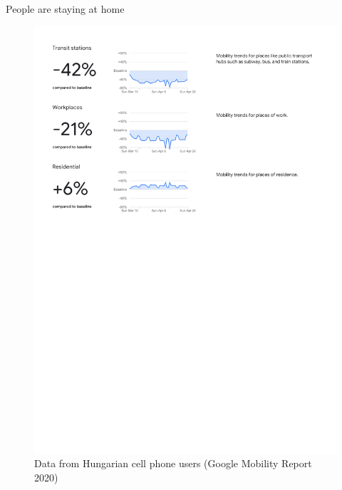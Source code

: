 \documentclass[ignorenonframetext,aspectratio=54,]{beamer}
\begin{document}
\begin{frame}{People are staying at home}
\protect\hypertarget{people-are-staying-at-home}{}

\begin{figure}
\centering
\includegraphics[width=1\textwidth,height=\textheight]{exhibit/fig/gmr-home.pdf}
\caption{Data from Hungarian cell phone users (Google Mobility Report
2020)}
\end{figure}

\end{frame}
\end{document}
